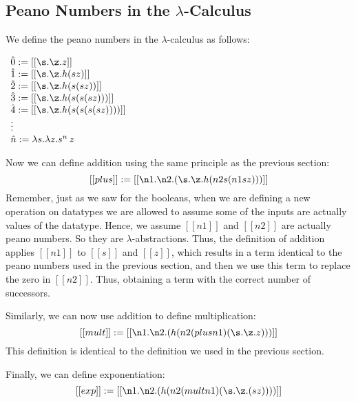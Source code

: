 \documentclass{article}
\begin{document}
\subsection{Peano Numbers in the $\lambda$-Calculus}
\label{subsec:peano_numbers_in_the_lam-calculus}
We define the peano numbers in the $\lambda$-calculus as follows:
\begin{center}
  \begin{math}
    \begin{array}{lll}
      \hat{0} := [[\s.\z.z]]\\
      \hat{1} := [[\s.\z.h(s z)]]\\
      \hat{2} := [[\s.\z.h(s (s z))]]\\
      \hat{3} := [[\s.\z.h(s (s (s z)))]]\\
      \hat{4} := [[\s.\z.h(s (s (s (s z))))]]\\
      \vdots \\
      \hat{n} := \lambda s.\lambda z.s^n\,z
    \end{array}
  \end{math}
\end{center}
Now we can define addition using the same principle as the previous section:
\[ [[plus]] := [[\n1.\n2.(\s.\z.h(n2 s (n1 s z)))]] \] Remember, just
as we saw for the booleans, when we are defining a new operation on
datatypes we are allowed to assume some of the inputs are actually
values of the datatype.  Hence, we assume $[[n1]]$ and $[[n2]]$ are
actually peano numbers.  So they are $\lambda$-abstractions. Thus, the
definition of addition applies $[[n1]]$ to $[[s]]$ and $[[z]]$, which
results in a term identical to the peano numbers used in the previous
section, and then we use this term to replace the zero in $[[n2]]$.
Thus, obtaining a term with the correct number of successors.

Similarly, we can now use addition to define multiplication:
\[ [[mult]] := [[\n1.\n2.(h(n2 (plus n1) (\s.\z.z)))]]\] This definition
is identical to the definition we used in the previous section.

Finally, we can define exponentiation:
\[ [[exp]] := [[\n1.\n2.(h(n2 (mult n1) (\s.\z.(s z))))]] \]



% 
% 
\end{document}
